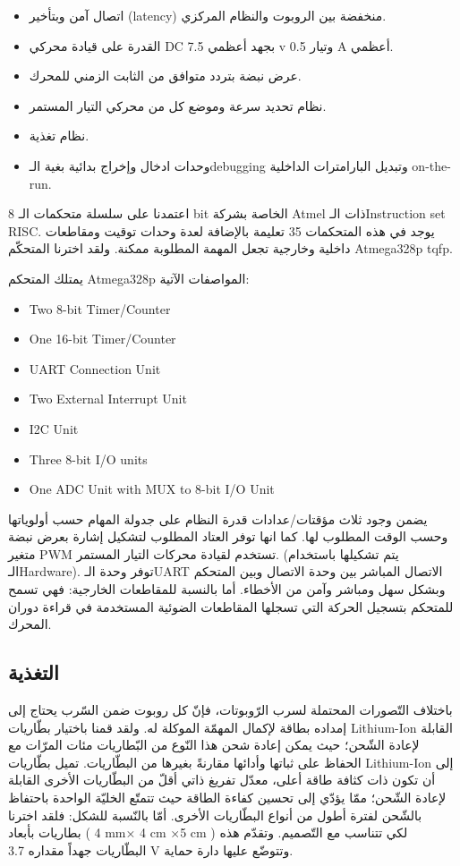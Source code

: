\begin{itemize}
	\item اتصال آمن وبتأخير (latency) منخفضة بين الروبوت والنظام المركزي.
	\item القدرة على قيادة محركي DC بجهد أعظمي 7.5 v وتيار 0.5 A أعظمي.
	\item عرض نبضة بتردد متوافق من الثابت الزمني للمحرك.
	\item نظام تحديد سرعة وموضع كل من محركي التيار المستمر.
	\item نظام تغذية.
	\item وحدات ادخال وإخراج بدائية بغية الـdebugging وتبديل البارامترات الداخلية on-the-run.
\end{itemize}

اعتمدنا على سلسلة متحكمات الـ 8 bit الخاصة بشركة Atmel ذات الـInstruction set RISC. يوجد في هذه المتحكمات 35 تعليمة بالإضافة لعدة وحدات توقيت ومقاطعات داخلية وخارجية تجعل المهمة المطلوبة ممكنة. ولقد اخترنا المتحكّم  Atmega328p tqfp.

يمتلك المتحكم Atmega328p المواصفات الآتية:
\begin{english}
\begin{itemize}
	\item Two 8-bit Timer/Counter
	\item One 16-bit Timer/Counter
	\item UART Connection Unit
	\item Two External Interrupt Unit
	\item I2C Unit
	\item Three 8-bit I/O units
	\item One ADC Unit with MUX to 8-bit I/O Unit
\end{itemize}
\end{english}


يضمن وجود ثلاث مؤقتات/عدادات قدرة النظام على جدولة المهام حسب أولوياتها وحسب الوقت المطلوب لها. كما انها توفر العتاد المطلوب لتشكيل إشارة بعرض نبضة متغير PWM تستخدم لقيادة محركات التيار المستمر. (يتم تشكيلها باستخدام الـHardware). توفر وحدة الـUART الاتصال المباشر بين وحدة الاتصال وبين المتحكم وبشكل سهل ومباشر وآمن من الأخطاء. أما بالنسبة للمقاطعات الخارجية: فهي تسمح للمتحكم بتسجيل الحركة التي تسجلها المقاطعات الضوئية المستخدمة في قراءة دوران المحرك.

\subsection{التغذية}

باختلاف التّصورات المحتملة لسرب الرّوبوتات، فإنّ كل روبوت ضمن السّرب يحتاج إلى إمداده بطاقة لإكمال المهمّة الموكلة له. ولقد قمنا باختيار بطّاريات  Lithium-Ion القابلة لإعادة الشّحن؛ حيث يمكن إعادة شحن هذا النّوع من البّطاريات مئات المرّات مع الحفاظ على ثباتها وأدائها مقارنةً بغيرها من البطّاريات. تميل بطّاريات Lithium-Ion إلى أن تكون ذات كثافة طاقة أعلى، معدّل تفريغ ذاتي أقلّ من البطّاريات الأخرى القابلة لإعادة الشّحن؛ ممّا يؤدّي إلى تحسين كفاءة الطاقة حيث تتمتّع الخليّة الواحدة باحتفاظ بالشّحن لفترة أطول من أنواع البطّاريات الأخرى. أمّا بالنّسبة للشكل: فلقد اخترنا بطاريات بأبعاد ( 4 mm× 4 cm ×5 cm ) لكي تتناسب مع التّصميم. وتقدّم هذه البطّاريات جهداً مقداره 3.7 V وتتوضّع عليها دارة حماية.

